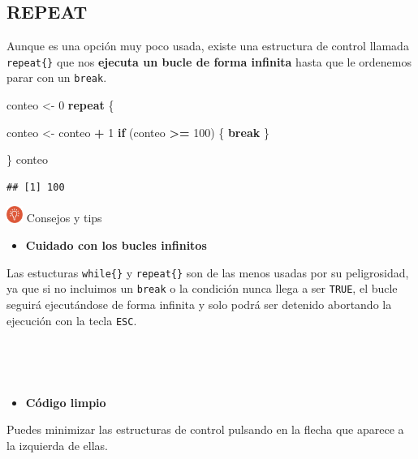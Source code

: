 \documentclass[11pt,]{book}
\newenvironment{Shaded}{\begin{snugshade}}{\end{snugshade}}
\newcommand{\ControlFlowTok}[1]{\textcolor[rgb]{0.27,0.27,0.27}{\textbf{#1}}}
\newcommand{\DecValTok}[1]{\textcolor[rgb]{0.06,0.06,0.06}{#1}}
\newcommand{\NormalTok}[1]{#1}
\newcommand{\OperatorTok}[1]{\textcolor[rgb]{0.43,0.43,0.43}{\textbf{#1}}}
\newcommand{\StringTok}[1]{\textcolor[rgb]{0.5,0.5,0.5}{#1}}
\providecommand{\tightlist}{%
  \setlength{\itemsep}{0pt}\setlength{\parskip}{0pt}}
\begin{document}
\hypertarget{repeat}{%
\subsection{REPEAT}\label{repeat}}

Aunque es una opción muy poco usada, existe una estructura de control llamada \texttt{repeat\{\}} que nos \textbf{ejecuta un bucle de forma infinita} hasta que le ordenemos parar con un \texttt{break}.

\begin{Shaded}
\begin{Highlighting}[]
\NormalTok{conteo <-}\StringTok{ }\DecValTok{0}
\ControlFlowTok{repeat}\NormalTok{ \{ }
  
\NormalTok{  conteo <-}\StringTok{ }\NormalTok{conteo }\OperatorTok{+}\StringTok{ }\DecValTok{1}
  \ControlFlowTok{if}\NormalTok{ (conteo }\OperatorTok{>=}\StringTok{ }\DecValTok{100}\NormalTok{) \{ }\ControlFlowTok{break}\NormalTok{ \}}
  
\NormalTok{\}}
\NormalTok{conteo}
\end{Highlighting}
\end{Shaded}

\begin{verbatim}
## [1] 100
\end{verbatim}

\includegraphics[width=0.04\textwidth,height=\textheight]{img/logo_info.png} Consejos y tips

\begin{itemize}
\tightlist
\item
  \textbf{Cuidado con los bucles infinitos}
\end{itemize}

Las estucturas \texttt{while\{\}} y \texttt{repeat\{\}} son de las menos usadas por su peligrosidad, ya que si no incluimos un \texttt{break} o la condición nunca llega a ser \texttt{TRUE}, el bucle seguirá ejecutándose de forma infinita y solo podrá ser detenido abortando la ejecución con la tecla \texttt{ESC}.

~

~

\begin{itemize}
\tightlist
\item
  \textbf{Código limpio}
\end{itemize}

Puedes minimizar las estructuras de control pulsando en la flecha que aparece a la izquierda de ellas.
\end{document}
